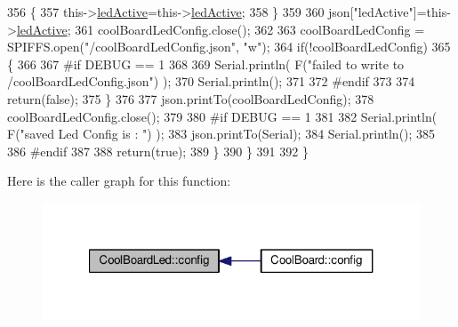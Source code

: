 \begin{DoxyCode}
356             \{
357                 this->\hyperlink{classCoolBoardLed_a5f17c135516fcf4b44ea8a096ba0177a}{ledActive}=this->\hyperlink{classCoolBoardLed_a5f17c135516fcf4b44ea8a096ba0177a}{ledActive};          
358             \}
359             
360             json[\textcolor{stringliteral}{"ledActive"}]=this->\hyperlink{classCoolBoardLed_a5f17c135516fcf4b44ea8a096ba0177a}{ledActive};
361             coolBoardLedConfig.close();
362             
363             coolBoardLedConfig = SPIFFS.open(\textcolor{stringliteral}{"/coolBoardLedConfig.json"}, \textcolor{stringliteral}{"w"});
364             \textcolor{keywordflow}{if}(!coolBoardLedConfig)
365             \{
366             
367 \textcolor{preprocessor}{            #if DEBUG == 1 }
368 
369                 Serial.println( F(\textcolor{stringliteral}{"failed to write to /coolBoardLedConfig.json"}) );
370                 Serial.println();
371 
372 \textcolor{preprocessor}{            #endif}
373 
374                 \textcolor{keywordflow}{return}(\textcolor{keyword}{false});          
375             \}
376 
377             json.printTo(coolBoardLedConfig);
378             coolBoardLedConfig.close();
379 
380 \textcolor{preprocessor}{        #if DEBUG == 1}
381     
382             Serial.println( F(\textcolor{stringliteral}{"saved Led Config is : "}) );
383             json.printTo(Serial);
384             Serial.println();
385 
386 \textcolor{preprocessor}{        #endif}
387 
388             \textcolor{keywordflow}{return}(\textcolor{keyword}{true}); 
389         \}
390     \}   
391 
392 \}               
\end{DoxyCode}
Here is the caller graph for this function\+:
\nopagebreak
\begin{figure}[H]
\begin{center}
\leavevmode
\includegraphics[width=321pt]{classCoolBoardLed_a1b60e5e30bea96c49ed62ed1bf1ffc8b_icgraph}
\end{center}
\end{figure}
\mbox{\label{classCoolBoardLed_a69f323359e0c9f797422f2152b5d41ef}} 
